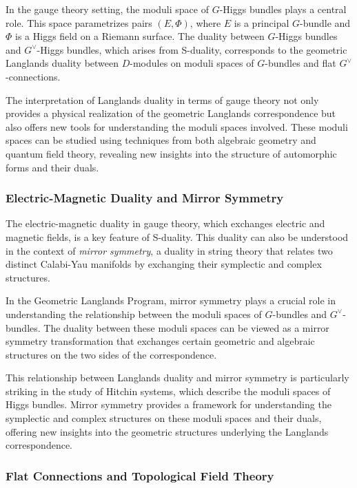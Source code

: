 \documentclass{article}
\theoremstyle{remark}
\begin{document}
In the gauge theory setting, the moduli space of $G$-Higgs bundles plays a central role. This space parametrizes pairs $(E, \Phi)$, where $E$ is a principal $G$-bundle and $\Phi$ is a Higgs field on a Riemann surface. The duality between $G$-Higgs bundles and $G^\vee$-Higgs bundles, which arises from S-duality, corresponds to the geometric Langlands duality between $D$-modules on moduli spaces of $G$-bundles and flat $G^\vee$-connections.

The interpretation of Langlands duality in terms of gauge theory not only provides a physical realization of the geometric Langlands correspondence but also offers new tools for understanding the moduli spaces involved. These moduli spaces can be studied using techniques from both algebraic geometry and quantum field theory, revealing new insights into the structure of automorphic forms and their duals.

\subsubsection{Electric-Magnetic Duality and Mirror Symmetry}

The electric-magnetic duality in gauge theory, which exchanges electric and magnetic fields, is a key feature of S-duality. This duality can also be understood in the context of \emph{mirror symmetry}, a duality in string theory that relates two distinct Calabi-Yau manifolds by exchanging their symplectic and complex structures.

In the Geometric Langlands Program, mirror symmetry plays a crucial role in understanding the relationship between the moduli spaces of $G$-bundles and $G^\vee$-bundles. The duality between these moduli spaces can be viewed as a mirror symmetry transformation that exchanges certain geometric and algebraic structures on the two sides of the correspondence.

This relationship between Langlands duality and mirror symmetry is particularly striking in the study of Hitchin systems, which describe the moduli spaces of Higgs bundles. Mirror symmetry provides a framework for understanding the symplectic and complex structures on these moduli spaces and their duals, offering new insights into the geometric structures underlying the Langlands correspondence.

\subsubsection{Flat Connections and Topological Field Theory}
\end{document}

